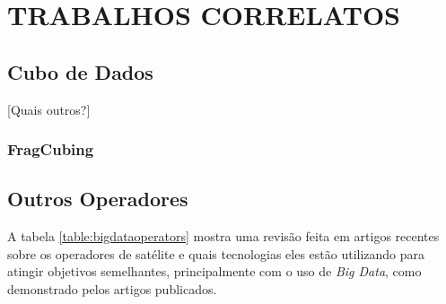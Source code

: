 
\chapter{TRABALHOS CORRELATOS}
\label{ch:corr}

{\color{red}
\section{Cubo de Dados}
\label{ch:corr:cube}

[Quais outros?] 

\subsection{FragCubing}
\label{ch:corr:cube:frag}

}

\section{Outros Operadores}
\label{ch:corr:ops}

A tabela \ref{table:bigdataoperators} mostra uma revisão feita em artigos recentes sobre os operadores de satélite e quais tecnologias eles estão utilizando para atingir objetivos semelhantes, principalmente com o uso de \textit{Big Data}, como demonstrado pelos artigos publicados.

